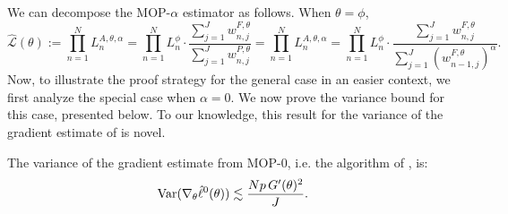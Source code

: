 We can decompose the MOP-$\alpha$ estimator as follows. 
When $\theta=\phi$,
\begin{equation}
\hat{\mathcal{L}}(\theta):=\prod_{n=1}^N L_n^{A, \theta, \alpha}=\prod_{n=1}^N L_n^\phi \cdot \frac{\sum_{j=1}^J w_{n, j}^{F, \theta}}{\sum_{j=1}^J w_{n, j}^{P, \theta}}=\prod_{n=1}^N L_n^{A, \theta, \alpha}=\prod_{n=1}^N L_n^\phi \cdot \frac{\sum_{j=1}^J w_{n, j}^{F, \theta}}{\sum_{j=1}^J (w_{n-1, j}^{F, \theta})^\alpha}.
\end{equation}
Now, to illustrate the proof strategy for the general case in an easier context, we first analyze the special case when $\alpha=0.$ We now prove the variance bound for this case, presented below. To our knowledge, this result for the variance of the gradient estimate of \cite{naesseth18} is novel. 
\begin{thm}
The variance of the gradient estimate from MOP-$0$, i.e. the algorithm of \cite{naesseth18}, is:
 \begin{equation}
     \mathrm{Var}(\nabla_\theta \hat\ell^0(\theta)) \lesssim \frac{Np \, G'(\theta)^2}{J}.
 \end{equation}
\end{thm}
